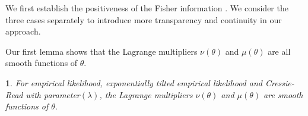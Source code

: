 \documentclass[oneside,english]{amsbook}
\numberwithin{section}{chapter}
\numberwithin{equation}{section}
\numberwithin{figure}{section}
\theoremstyle{plain}
\newtheorem{lem}{\protect\lemmaname}
\theoremstyle{plain}
\theoremstyle{definition}
\theoremstyle{plain}
\theoremstyle{plain}
\theoremstyle{remark}
\theoremstyle{definition}
\theoremstyle{definition}
\providecommand{\lemmaname}{Lemma}
\begin{document}
We first establish the positiveness of the Fisher information . We
consider the three cases separately to introduce more transparency
and continuity in our approach. 

Our first lemma shows that the Lagrange multipliers $\nu\left(\theta\right)$
and $\mu\left(\theta\right)$ are all smooth functions of $\theta$.

\begin{lem}
\label{lem:first-order-smooth-lagmul}For empirical likelihood, exponentially
tilted empirical likelihood and Cressie-Read with parameter$\left(\lambda\right)$,
the Lagrange multipliers $\nu\left(\theta\right)$ and $\mu\left(\theta\right)$
are smooth functions of $\theta.$\end{lem}
\end{document}
